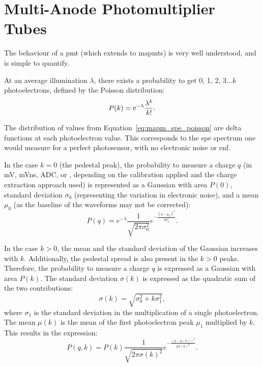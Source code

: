 \section{Multi-Anode Photomultiplier Tubes}

The behaviour of a \gls{pmt} (which extends to \glspl{mapmt}) is very well understood, and is simple to quantify. 

At an average illumination $\lambda$, there exists a probability to get 0, 1, 2, 3...$k$ photoelectrons, defined by the Poisson distribution:
\begin{equation} \label{eq:mapm_spe_poisson}
P(k) = \mathrm{e}^{-\lambda} \frac{\lambda^k}{k!}.
\end{equation}

The distribution of values from Equation~\ref{eq:mapm_spe_poisson} are delta functions at each photoelectron value. This corresponds to the \gls{spe} spectrum one would measure for a perfect photosensor, with no electronic noise or \gls{enf}. 

In the case $k = 0$ (the pedestal peak), the probability to measure a charge $q$ (in \si{mV}, \si{mVns}, \si{ADC}, or \si{\pe}, depending on the calibration applied and the charge extraction approach used) is represented as a Gaussian with area $P(0)$, standard deviation $\sigma_0$ (representing the variation in electronic noise), and a mean $\mu_0$ (as the baseline of the waveforms may not be corrected):
\begin{equation} \label{eq:mapm_spe_ped}
P(q) = e^{-\lambda} \frac{1}{\sqrt{2 \pi \sigma_0^2}} e^{-\frac{(q - \mu_0)^2}{2 \sigma_0^2}}.
\end{equation}

In the case $k > 0$, the mean and the standard deviation of the Gaussian increases with $k$. Additionally, the pedestal spread is also present in the $k > 0$ peaks. Therefore, the probability to measure a charge $q$ is expressed as a Gaussian with area $P(k)$. The standard deviation $\sigma(k)$ is expressed as the quadratic sum of the two contributions:
\begin{equation}
\sigma(k) = \sqrt{\sigma_0^2 + k \sigma_1^2},
\end{equation}
where $\sigma_1$ is the standard deviation in the multiplication of a single photoelectron.
The mean $\mu(k)$ is the mean of the first photoelectron peak $\mu_1$ multiplied by $k$. This results in the expression:
\begin{equation}
P(q, k) = P(k) \frac{1}{\sqrt{2 \pi \sigma(k)^2}} e^{-\frac{(q - \mu(k))^2}{2 \sigma(k)^2}}.
\end{equation}

